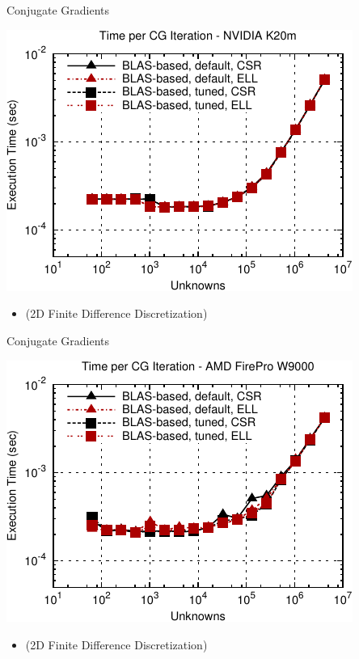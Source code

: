 

\begin{frame}[fragile]{Conjugate Gradients}
 \begin{block}{}
 \begin{center}
  \vspace*{-0.5cm}
  \includegraphics[width=0.85\textwidth]{figures/cg-k20m-2}
 \end{center}

 \begin{itemize}
  \item   \vspace*{-0.3cm} {\small (2D Finite Difference Discretization)}
 \end{itemize}
 \end{block}   
\end{frame}

\begin{frame}[fragile]{Conjugate Gradients}
 \begin{block}{}
 \begin{center}
  \vspace*{-0.5cm}
  \includegraphics[width=0.85\textwidth]{figures/cg-firepro-w9000-2}
 \end{center}

 \begin{itemize}
  \item   \vspace*{-0.3cm} {\small (2D Finite Difference Discretization)}
 \end{itemize}
 \end{block}   
\end{frame}


